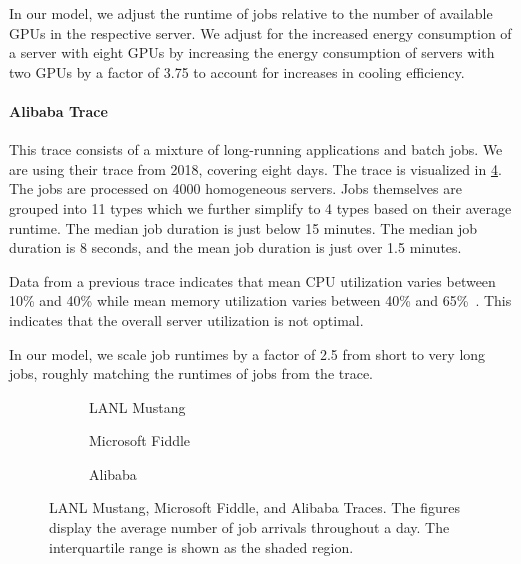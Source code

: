 In our model, we adjust the runtime of jobs relative to the number of available GPUs in the respective server. We adjust for the increased energy consumption of a server with eight GPUs by increasing the energy consumption of servers with two GPUs by a factor of 3.75 to account for increases in cooling efficiency.

\paragraph{Alibaba Trace~\cite{Alibaba2018}} This trace consists of a mixture of long-running applications and batch jobs. We are using their trace from 2018, covering eight days. The trace is visualized in \cref{fig:alibaba:histogram}. The jobs are processed on 4000 homogeneous servers. Jobs themselves are grouped into 11 types which we further simplify to 4 types based on their average runtime. The median job duration is just below 15 minutes. The median job duration is 8 seconds, and the mean job duration is just over 1.5 minutes.

Data from a previous trace indicates that mean CPU utilization varies between 10\% and 40\% while mean memory utilization varies between 40\% and 65\%~\cite{Lu2017}. This indicates that the overall server utilization is not optimal.

In our model, we scale job runtimes by a factor of 2.5 from short to very long jobs, roughly matching the runtimes of jobs from the trace.

\begin{figure}
    \begin{subfigure}[b]{.3425\linewidth}
    \resizebox{\textwidth}{!}{}
    \caption{LANL Mustang}\label{fig:los_alamos:histogram}
    \end{subfigure}
    \begin{subfigure}[b]{.32\linewidth}
    \resizebox{\textwidth}{!}{}
    \caption{Microsoft Fiddle}\label{fig:microsoft:histogram}
    \end{subfigure}
    \begin{subfigure}[b]{.32\linewidth}
    \resizebox{\textwidth}{!}{}
    \caption{Alibaba}\label{fig:alibaba:histogram}
    \end{subfigure}
    \caption{LANL Mustang, Microsoft Fiddle, and Alibaba Traces. The figures display the average number of job arrivals throughout a day. The interquartile range is shown as the shaded region.}
\end{figure}

